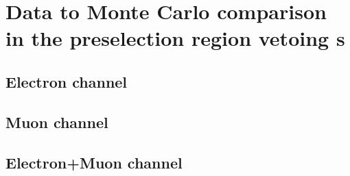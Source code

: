 \clearpage{\pagestyle{empty}\cleardoublepage}

\chapter{Data to Monte Carlo comparison in the preselection region vetoing \bjet s}
\label{app:datamc0tagex}

\section{Electron channel}

\section{Muon channel}

\section{Electron+Muon channel}


